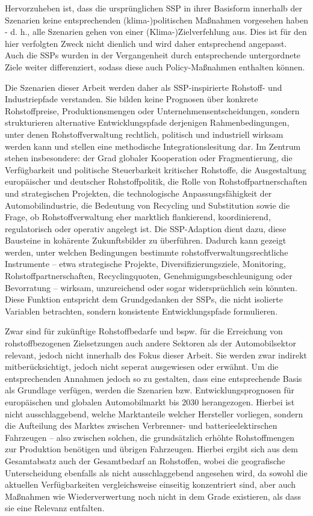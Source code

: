 \documentclass[12pt,a4paper,oneside]{book} %
\begin{document}
Hervorzuheben ist, dass die ursprünglichen SSP in ihrer Basisform innerhalb der Szenarien keine entsprechenden (klima-)politischen Maßnahmen vorgesehen haben - d. h., alle Szenarien gehen von einer (Klima-)Zielverfehlung aus. Dies ist für den hier verfolgten Zweck nicht dienlich und wird daher entsprechend angepasst. Auch die SSPs wurden in der Vergangenheit durch entsprechende untergordnete Ziele weiter differenziert, sodass diese auch Policy-Maßnahmen enthalten können.

Die Szenarien dieser Arbeit werden daher als SSP-inspirierte Rohstoff- und Industriepfade verstanden. Sie bilden keine Prognosen über konkrete Rohstoffpreise, Produktionsmengen oder Unternehmensentscheidungen, sondern strukturieren alternative Entwicklungspfade derjenigen Rahmenbedingungen, unter denen Rohstoffverwaltung rechtlich, politisch und industriell wirksam werden kann und stellen eine methodische Integrationslesitung dar.  Im Zentrum stehen insbesondere: der Grad globaler Kooperation oder Fragmentierung, die Verfügbarkeit und politische Steuerbarkeit kritischer Rohstoffe, die Ausgestaltung europäischer und deutscher Rohstoffpolitik, die Rolle von Rohstoffpartnerschaften und strategischen Projekten, die technologische Anpassungsfähigkeit der Automobilindustrie, die Bedeutung von Recycling und Substitution sowie die Frage, ob Rohstoffverwaltung eher marktlich flankierend, koordinierend, regulatorisch oder operativ angelegt ist. Die SSP-Adaption dient dazu, diese Bausteine in kohärente Zukunftsbilder zu überführen. Dadurch kann gezeigt werden, unter welchen Bedingungen bestimmte rohstoffverwaltungsrechtliche Instrumente – etwa strategische Projekte, Diversifizierungsziele, Monitoring, Rohstoffpartnerschaften, Recyclingquoten, Genehmigungsbeschleunigung oder Bevorratung – wirksam, unzureichend oder sogar widersprüchlich sein könnten. Diese Funktion entspricht dem Grundgedanken der SSPs, die nicht isolierte Variablen betrachten, sondern konsistente Entwicklungspfade formulieren.

Zwar sind für zukünftige Rohstoffbedarfe und bspw. für die Erreichung von rohstoffbezogenen Zielsetzungen auch andere Sektoren als der Automobilsektor relevant, jedoch nicht innerhalb des Fokus dieser Arbeit. Sie werden zwar indirekt mitberücksichtigt, jedoch nicht seperat ausgewiesen oder erwähnt. Um die entsprechenden Annahmen jedoch so zu gestalten, dass eine entsprechende Basis als Grundlage verfügen, werden die Szenarien bzw. Entwicklungsprognosen für europäischen und globalen Automobilmarkt bis 2030 herangezogen. Hierbei ist nicht ausschlaggebend, welche Marktanteile welcher Hersteller vorliegen, sondern die Aufteilung des Marktes zwischen Verbrenner- und batterieelektirschen Fahrzeugen -- also zwischen solchen, die grundsätzlich erhöhte Rohstoffmengen zur Produktion benötigen und übrigen Fahrzeugen. Hierbei ergibt sich aus dem Gesamtabsatz auch der Gesamtbedarf an Rohstoffen, wobei die geografische Unterscheidung ebenfalls als nicht ausschlaggebend angesehen wird, da sowohl die aktuellen Verfügbarkeiten vergleichsweise einseitig konzentriert sind, aber auch Maßnahmen wie Wiederverwertung noch nicht in dem Grade existieren, als dass sie eine Relevanz entfalten.
\end{document}

